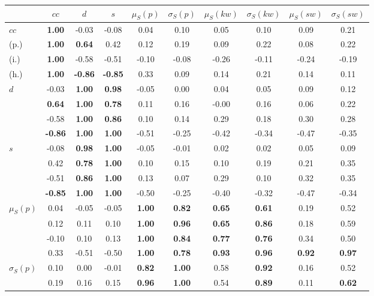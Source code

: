 \begin{table*}[h!]
\begin{center}
\begin{tabular}{| l || c | c | c | c | c | c | c | c | c |}\hline
 & $cc$ & $d$ & $s$ & $\mu_S(p)$ & $\sigma_S(p)$ & $\mu_S(kw)$ & $\sigma_S(kw)$ & $\mu_S(sw)$ & $\sigma_S(sw)$ \\\hline\hline
$cc$ & {\bf 1.00} & -0.03 & -0.08 & 0.04 & 0.10 & 0.05 & 0.10 & 0.09 & 0.21 \\
(p.) & {\bf 1.00} & {\bf 0.64} & 0.42 & 0.12 & 0.19 & 0.09 & 0.22 & 0.08 & 0.22 \\
(i.) & {\bf 1.00} & -0.58 & -0.51 & -0.10 & -0.08 & -0.26 & -0.11 & -0.24 & -0.19 \\
(h.) & {\bf 1.00} & {\bf -0.86} & {\bf -0.85} & 0.33 & 0.09 & 0.14 & 0.21 & 0.14 & 0.11 \\\hline
$d$ & -0.03 & {\bf 1.00} & {\bf 0.98} & -0.05 & 0.00 & 0.04 & 0.05 & 0.09 & 0.12 \\
 & {\bf 0.64} & {\bf 1.00} & {\bf 0.78} & 0.11 & 0.16 & -0.00 & 0.16 & 0.06 & 0.22 \\
 & -0.58 & {\bf 1.00} & {\bf 0.86} & 0.10 & 0.14 & 0.29 & 0.18 & 0.30 & 0.28 \\
 & {\bf -0.86} & {\bf 1.00} & {\bf 1.00} & -0.51 & -0.25 & -0.42 & -0.34 & -0.47 & -0.35 \\\hline
$s$ & -0.08 & {\bf 0.98} & {\bf 1.00} & -0.05 & -0.01 & 0.02 & 0.02 & 0.05 & 0.09 \\
 & 0.42 & {\bf 0.78} & {\bf 1.00} & 0.10 & 0.15 & 0.10 & 0.19 & 0.21 & 0.35 \\
 & -0.51 & {\bf 0.86} & {\bf 1.00} & 0.13 & 0.07 & 0.29 & 0.10 & 0.32 & 0.35 \\
 & {\bf -0.85} & {\bf 1.00} & {\bf 1.00} & -0.50 & -0.25 & -0.40 & -0.32 & -0.47 & -0.34 \\\hline
$\mu_S(p)$ & 0.04 & -0.05 & -0.05 & {\bf 1.00} & {\bf 0.82} & {\bf 0.65} & {\bf 0.61} & 0.19 & 0.52 \\
 & 0.12 & 0.11 & 0.10 & {\bf 1.00} & {\bf 0.96} & {\bf 0.65} & {\bf 0.86} & 0.18 & 0.59 \\
 & -0.10 & 0.10 & 0.13 & {\bf 1.00} & {\bf 0.84} & {\bf 0.77} & {\bf 0.76} & 0.34 & 0.50 \\
 & 0.33 & -0.51 & -0.50 & {\bf 1.00} & {\bf 0.78} & {\bf 0.93} & {\bf 0.96} & {\bf 0.92} & {\bf 0.97} \\\hline
$\sigma_S(p)$ & 0.10 & 0.00 & -0.01 & {\bf 0.82} & {\bf 1.00} & 0.58 & {\bf 0.92} & 0.16 & 0.52 \\
 & 0.19 & 0.16 & 0.15 & {\bf 0.96} & {\bf 1.00} & 0.54 & {\bf 0.89} & 0.11 & {\bf 0.62} \\

\end{tabular}
\end{center}
\end{table*}
